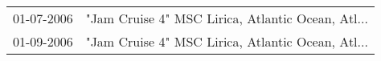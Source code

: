 \begin{supertabular}{ll}
 01-07-2006 &  "Jam Cruise 4" MSC Lirica, Atlantic Ocean, Atl... \\
 01-09-2006 &  "Jam Cruise 4" MSC Lirica, Atlantic Ocean, Atl... \\
\end{supertabular}

